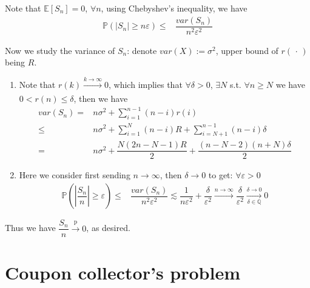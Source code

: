 \documentclass[11pt,a4paper]{article}
\numberwithin{equation}{section}%
\begin{document}
Note that $ \mathbb{E}\left[ S_n \right] =0 $, $ \forall n $, using Chebyshev's inequality, we have
\begin{align*}
    \mathbb{P}\left( \left\vert S_n \right\vert \geq n\varepsilon  \right)  \leq & \dfrac{ var(S_n) }{ n^2\varepsilon ^2 } 
\end{align*}

Now we study the variance of $ S_n $: denote $ var(X):=\sigma ^2 $, upper bound of $ r(\, \cdot \, ) $ being $ R $.
\begin{enumerate}[topsep=2pt,itemsep=0pt]
    \item Note that $ r(k)\xrightarrow[]{k\to \infty} 0 $, which implies that $ \forall \delta >0 $, $ \exists N $ s.t. $ \forall n\geq N $ we have $ 0< r(n)\leq \delta  $, then we have
    \begin{align*}
        var(S_n)=&  n\sigma^2 + \sum_{i=1}^{n-1} (n-i)r(i)\\
        \leq & n\sigma^2 + \sum_{i=1}^{N} (n-i)R + \sum_{i=N+1}^{n-1} (n-i)\delta\\
        =& n\sigma^2 + \dfrac{ N(2n-N-1)R }{ 2 } + \dfrac{ (n-N-2)(n+N)\delta  }{ 2 }
    \end{align*}
    \item Here we consider first sending $ n\to\infty $, then $ \delta \to 0 $ to get: $ \forall \varepsilon >0 $
    \begin{align*}
        \mathbb{P}\left( \left\vert \dfrac{ S_n }{ n }  \right\vert \geq \varepsilon  \right) \leq &  \dfrac{ var(S_n) }{ n^2\varepsilon ^2 } 
        \lesssim  \dfrac{ 1 }{ n\varepsilon ^2 } + \dfrac{ \delta  }{ \varepsilon ^2 }
        \xrightarrow[]{n\to\infty} \dfrac{ \delta  }{ \varepsilon ^2 } 
        \xrightarrow[\delta \in \mathbb{Q}]{\delta \to 0}  0 
    \end{align*}

\end{enumerate}

Thus we have $ \dfrac{ S_n }{ n } \xrightarrow[]{\mathrm{p}} 0 $, as desired.

    

\section{Coupon collector's problem}
\end{document}
